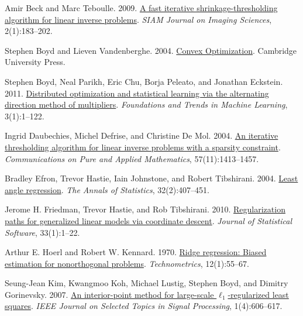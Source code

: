\documentclass[10pt,letterpaper]{article}
\begin{document}
\begingroup\small
\begin{thebibliography}{}
\setlength{\itemsep}{1pt}\setlength{\parskip}{0pt}
Amir Beck and Marc Teboulle. 2009.
\href{https://doi.org/10.1137/080716542}{A fast iterative shrinkage-thresholding algorithm for linear inverse problems}.
\emph{SIAM Journal on Imaging Sciences}, 2(1):183--202.

Stephen Boyd and Lieven Vandenberghe. 2004.
\href{https://web.stanford.edu/~boyd/cvxbook/}{Convex Optimization}.
Cambridge University Press.

Stephen Boyd, Neal Parikh, Eric Chu, Borja Peleato, and Jonathan Eckstein. 2011.
\href{https://doi.org/10.1561/2200000016}{Distributed optimization and statistical learning via the alternating direction method of multipliers}.
\emph{Foundations and Trends in Machine Learning}, 3(1):1--122.

Ingrid Daubechies, Michel Defrise, and Christine De Mol. 2004.
\href{https://doi.org/10.1002/cpa.20042}{An iterative thresholding algorithm for linear inverse problems with a sparsity constraint}.
\emph{Communications on Pure and Applied Mathematics}, 57(11):1413--1457.

Bradley Efron, Trevor Hastie, Iain Johnstone, and Robert Tibshirani. 2004.
\href{https://doi.org/10.1214/009053604000000067}{Least angle regression}.
\emph{The Annals of Statistics}, 32(2):407--451.

Jerome H. Friedman, Trevor Hastie, and Rob Tibshirani. 2010.
\href{https://doi.org/10.18637/jss.v033.i01}{Regularization paths for generalized linear models via coordinate descent}.
\emph{Journal of Statistical Software}, 33(1):1--22.

Arthur E. Hoerl and Robert W. Kennard. 1970.
\href{https://doi.org/10.1080/00401706.1970.10488634}{Ridge regression: Biased estimation for nonorthogonal problems}.
\emph{Technometrics}, 12(1):55--67.

Seung-Jean Kim, Kwangmoo Koh, Michael Lustig, Stephen Boyd, and Dimitry Gorinevsky. 2007.
\href{https://doi.org/10.1109/JSTSP.2007.910971}{An interior-point method for large-scale $\ell_1$-regularized least squares}.
\emph{IEEE Journal on Selected Topics in Signal Processing}, 1(4):606--617.


\end{thebibliography}
\end{document}
